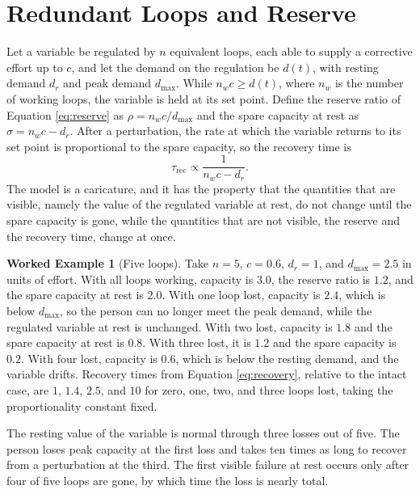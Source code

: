 \documentclass[11pt,openany]{book}
\theoremstyle{definition}
\newtheorem{example}{Worked Example}[chapter]
\theoremstyle{remark}
\begin{document}
\section{Redundant Loops and Reserve}

Let a variable be regulated by $n$ equivalent loops, each able to supply a corrective effort up to $c$, and let the demand on the regulation be $d(t)$, with resting demand $d_r$ and peak demand $d_{\max}$. While $n_wc\ge d(t)$, where $n_w$ is the number of working loops, the variable is held at its set point. Define the reserve ratio of Equation \eqref{eq:reserve} as $\rho=n_wc/d_{\max}$ and the spare capacity at rest as $\sigma=n_wc-d_r$. After a perturbation, the rate at which the variable returns to its set point is proportional to the spare capacity, so the recovery time is
\begin{equation}
\tau_{\mathrm{rec}}\propto\frac{1}{n_wc-d_r}.
\label{eq:recovery}
\end{equation}
The model is a caricature, and it has the property that the quantities that are visible, namely the value of the regulated variable at rest, do not change until the spare capacity is gone, while the quantities that are not visible, the reserve and the recovery time, change at once.

\begin{example}[Five loops]
\label{ex:fiveloops}
Take $n=5$, $c=0.6$, $d_r=1$, and $d_{\max}=2.5$ in units of effort. With all loops working, capacity is $3.0$, the reserve ratio is $1.2$, and the spare capacity at rest is $2.0$. With one loop lost, capacity is $2.4$, which is below $d_{\max}$, so the person can no longer meet the peak demand, while the regulated variable at rest is unchanged. With two lost, capacity is $1.8$ and the spare capacity at rest is $0.8$. With three lost, it is $1.2$ and the spare capacity is $0.2$. With four lost, capacity is $0.6$, which is below the resting demand, and the variable drifts. Recovery times from Equation \eqref{eq:recovery}, relative to the intact case, are $1$, $1.4$, $2.5$, and $10$ for zero, one, two, and three loops lost, taking the proportionality constant fixed.

The resting value of the variable is normal through three losses out of five. The person loses peak capacity at the first loss and takes ten times as long to recover from a perturbation at the third. The first visible failure at rest occurs only after four of five loops are gone, by which time the loss is nearly total.
\end{example}
\end{document}

